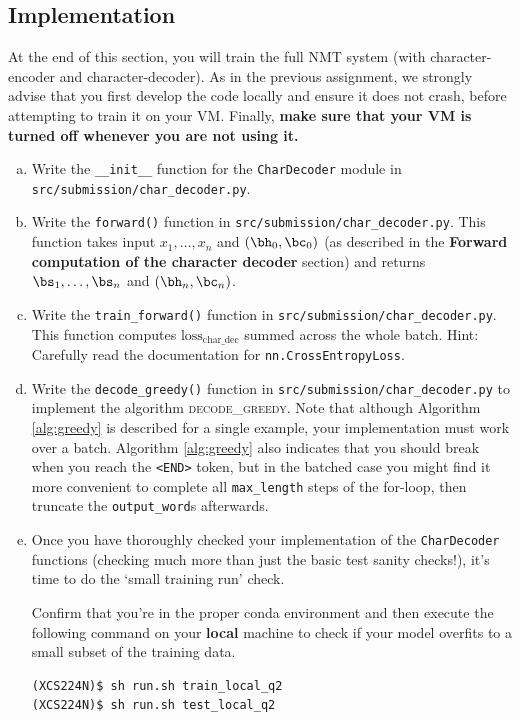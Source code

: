 \subsection*{Implementation}
At the end of this section, you will train the full NMT system (with character-encoder and character-decoder). 
As in the previous assignment, we strongly advise that you first develop the code locally and ensure it does not crash, before attempting to train it on your VM.
Finally, \textbf{make sure that your VM is turned off whenever you are not using it.}
\begin{enumerate}[(a)]
    \item {} Write the \texttt{\_\_init\_\_} function for the \texttt{CharDecoder} module in \texttt{src/submission/char\_decoder.py}.
    
    \item {} Write the \texttt{forward()}  function in \texttt{src/submission/char\_decoder.py}. This function takes input $x_1,\dots,x_n$ and $(\bh_0, \bc_0)$ (as described in the \textbf{Forward computation of the character decoder} section) and returns $\bs_1,\dots,\bs_n$ and $(\bh_n, \bc_n)$.

    \item {} Write the \texttt{train\_forward()} function in \texttt{src/submission/char\_decoder.py}. This function computes $\text{loss}_\text{char\_dec}$ summed across the whole batch. Hint: Carefully read the documentation for \texttt{nn.CrossEntropyLoss}.

    \item {} Write the \texttt{decode\_greedy()} function in \texttt{src/submission/char\_decoder.py} to implement the algorithm \textsc{decode\_greedy}. 
    Note that although Algorithm \ref{alg:greedy} is described for a single example, your implementation must work over a batch.
    Algorithm \ref{alg:greedy} also indicates that you should break when you reach the \texttt{<END>} token, but in the batched case you might find it more convenient to complete all \texttt{max\_length} steps of the for-loop, then truncate the \texttt{output\_word}s afterwards.

    \item {} \label{qn:run_tiny_dec} Once you have thoroughly checked your implementation of the \texttt{CharDecoder} functions (checking much more than just the basic test sanity checks!), it's time to do the `small training run' check.
    
    Confirm that you're in the proper conda environment and then execute the following command on your \textbf{local} machine to check if your model overfits to a small subset of the training data.
\begin{lstlisting}
(XCS224N)$ sh run.sh train_local_q2
(XCS224N)$ sh run.sh test_local_q2
\end{lstlisting}


\end{enumerate}
